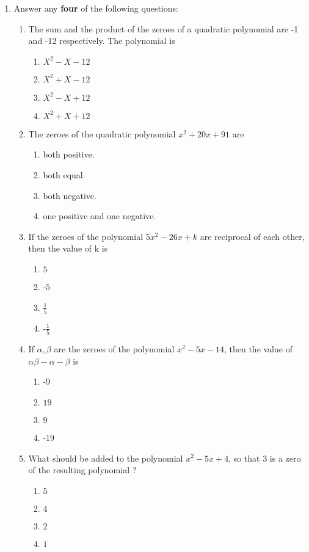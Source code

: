 \begin{enumerate}
\item Answer any \textbf{four} of the following questions:
\begin{enumerate}  
\item The sum and the product of the zeroes of a quadratic polynomial are -1 and -12 respectively. The polynomial is 
\begin{enumerate}  
\item $X^2-X-12$
\item $X^2+X-12$
\item $X^2-X+12$
\item $X^2+X+12$
\end{enumerate}  
\item The zeroes of the quadratic polynomial $x^2+20x+91$ are
\begin{enumerate}  
\item both positive.
\item both equal.
\item both negative.
\item one positive and one negative.  
\end{enumerate}  
\item  If the zeroes of the polynomial $5x^2-26x+k$ are reciprocal of each other, then the value of k is 
\begin{enumerate}  
\item  $5$
\item -$5$
\item  $\frac{1}{5}$
\item -$\frac{1}{5}$
\end{enumerate}  
\item   If $\alpha,\beta$ are the zeroes of the polynomial $x^2-5x-14$, then the value of $\alpha\beta-\alpha-\beta$ is
\begin{enumerate}  
\item -$9$
\item  $19$
\item  $9$
\item -$19$
\end{enumerate}  
\item What should be added to the polynomial $x^2-5x+4$, so that $3$ is a zero of the resulting polynomial ? 
\begin{enumerate}  
\item $5$
\item $4$
\item $2$
\item $1$
\end{enumerate} 
\end{enumerate}


\end{enumerate}
